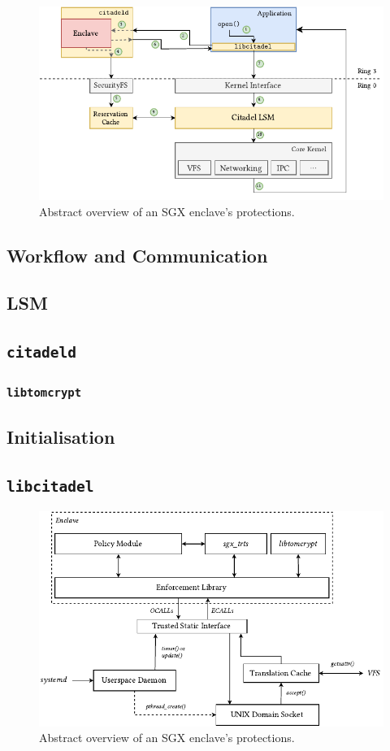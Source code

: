 \begin{figure}[]
    \centering
    \includegraphics[width=\linewidth]{figures/OverallArchitecture.pdf}
    \caption{Abstract overview of an SGX enclave's protections.}
    \label{fig:sgx-basic}
\end{figure}

\subsection{Workflow and Communication}
\subsection{LSM}
\subsection{\texttt{citadeld}}
\subsubsection{\texttt{libtomcrypt}}
\subsection{Initialisation}
\subsection{\texttt{libcitadel}}



\clearpage
\begin{figure}[]
    \centering
    \includegraphics[width=\linewidth]{figures/EnclaveLayout.pdf}
    \caption{Abstract overview of an SGX enclave's protections.}
    \label{fig:sgx-basic}
\end{figure}


